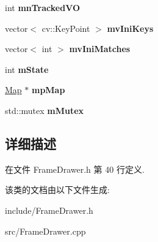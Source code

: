 \begin{DoxyCompactItemize}
\item 
\hypertarget{classORB__SLAM2_1_1FrameDrawer_ab1cbcb7a1443ceaaafaaf5537927f184}{int {\bfseries mn\-Tracked\-V\-O}}\label{classORB__SLAM2_1_1FrameDrawer_ab1cbcb7a1443ceaaafaaf5537927f184}

\item 
\hypertarget{classORB__SLAM2_1_1FrameDrawer_a890a8bd44745b16024e1d7e82ac1d3f0}{vector$<$ cv\-::\-Key\-Point $>$ {\bfseries mv\-Ini\-Keys}}\label{classORB__SLAM2_1_1FrameDrawer_a890a8bd44745b16024e1d7e82ac1d3f0}

\item 
\hypertarget{classORB__SLAM2_1_1FrameDrawer_a158a3ca6cab99c6bb691a7537212764b}{vector$<$ int $>$ {\bfseries mv\-Ini\-Matches}}\label{classORB__SLAM2_1_1FrameDrawer_a158a3ca6cab99c6bb691a7537212764b}

\item 
\hypertarget{classORB__SLAM2_1_1FrameDrawer_a00cc5f188d53b4d8f767f339515cc8e3}{int {\bfseries m\-State}}\label{classORB__SLAM2_1_1FrameDrawer_a00cc5f188d53b4d8f767f339515cc8e3}

\item 
\hypertarget{classORB__SLAM2_1_1FrameDrawer_a48374a37e72786b2e64c15c0ec13ce7b}{\hyperlink{classORB__SLAM2_1_1Map}{Map} $\ast$ {\bfseries mp\-Map}}\label{classORB__SLAM2_1_1FrameDrawer_a48374a37e72786b2e64c15c0ec13ce7b}

\item 
\hypertarget{classORB__SLAM2_1_1FrameDrawer_a1425b923def88314bb43eddf3eee4ddb}{std\-::mutex {\bfseries m\-Mutex}}\label{classORB__SLAM2_1_1FrameDrawer_a1425b923def88314bb43eddf3eee4ddb}

\end{DoxyCompactItemize}


\subsection{详细描述}


在文件 Frame\-Drawer.\-h 第 40 行定义.



该类的文档由以下文件生成\-:\begin{DoxyCompactItemize}
\item 
include/Frame\-Drawer.\-h\item 
src/Frame\-Drawer.\-cpp\end{DoxyCompactItemize}

